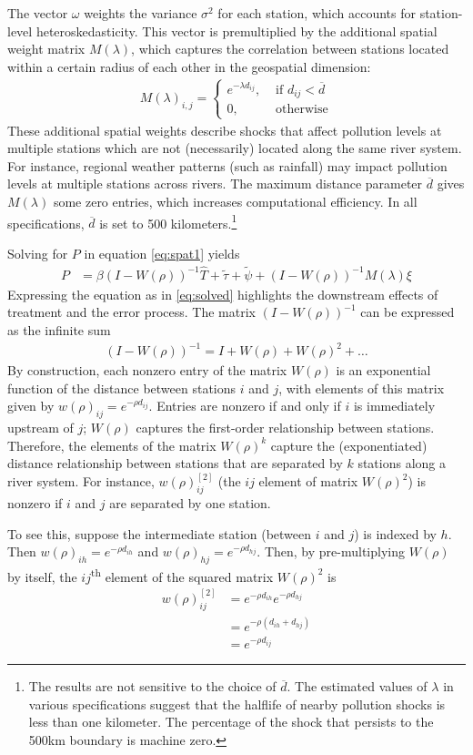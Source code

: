\documentclass[12pt]{article}
\newcommand{\anum}[1]{\begin{align}#1\end{align}}
\begin{document}
The vector $\omega$ weights the variance $\sigma^2$ for each station, which accounts for station-level heteroskedasticity. This vector is premultiplied by the additional spatial weight matrix $M(\lambda)$, which captures the correlation between stations located within a certain radius of each other in the geospatial dimension:
\anum{
	M(\lambda)_{i,j} = \begin{cases} e^{-\lambda d_{ij}}, &\text{ if $d_{ij} < \overline{d}$} \\ 0, &\text{ otherwise} \end{cases}
}
These additional spatial weights describe shocks that affect pollution levels at multiple stations which are not (necessarily) located along the same river system. For instance, regional weather patterns (such as rainfall) may impact pollution levels at multiple stations across rivers. The maximum distance parameter $\overline{d}$ gives $M(\lambda)$ some zero entries, which increases computational efficiency. In all specifications, $\overline{d}$ is set to 500 kilometers.\footnote{The results are not sensitive to the choice of $\overline{d}$. The estimated values of $\lambda$ in various specifications suggest that the halflife of nearby pollution shocks is less than one kilometer. The percentage of the shock that persists to the 500km boundary is machine zero.}

Solving for $P$ in equation \eqref{eq:spat1} yields
\anum{
	P &= \beta (I - W(\rho))^{-1} 	\widehat{T} + \widetilde{\tau} + \widetilde{\psi} + (I - W(\rho))^{-1}  M(\lambda) \xi \label{eq:solved}
}
Expressing the equation as in \eqref{eq:solved} highlights the downstream effects of treatment and the error process. The matrix $(I - W(\rho))^{-1}$ can be expressed as the infinite sum
\anum{
	(I - W(\rho))^{-1} = I + W(\rho) + W(\rho)^2 + \dots 
}
By construction, each nonzero entry of the matrix $W(\rho)$ is an exponential function of the distance between stations $i$ and $j$, with elements of this matrix given by $w(\rho)_{ij} = e^{-\rho d_{ij}}$. Entries are nonzero if and only if $i$ is immediately upstream of $j$; $W(\rho)$ captures the first-order relationship between stations. Therefore, the elements of the matrix $W(\rho)^k$ capture the (exponentiated) distance relationship between stations that are separated by $k$ stations along a river system. For instance, $w(\rho)_{ij}^{[2]}$ (the $ij$ element of matrix $W(\rho)^2$) is nonzero if $i$ and $j$ are separated by one station. 

To see this, suppose the intermediate station (between $i$ and $j$) is indexed by $h$. Then $w(\rho)_{ih} = e^{-\rho d_{ih}}$ and $w(\rho)_{hj} = e^{-\rho d_{hj}}$. Then, by pre-multiplying $W(\rho)$ by itself, the $ij$\textsuperscript{th} element of the squared matrix $W(\rho)^2$ is
\anum{
  w(\rho)_{ij}^{[2]} &= e^{-\rho d_{ih}}e^{-\rho d_{hj}} \\
  &= e^{-\rho (d_{ih} + d_{hj})} \\
  &= e^{-\rho d_{ij}}
}
\end{document}
